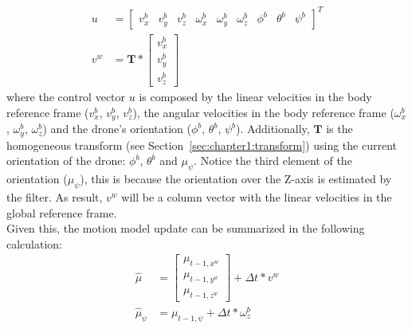 \begin{align}
    u &= \begin{bmatrix} v_x^b & v_y^b & v_z^b & \omega_x^b & \omega_y^b & \omega_z^b & \phi^b & \theta^b & \psi^b \end{bmatrix}^T\\
    v^w &= \textbf{T} * \begin{bmatrix} v_x^b \\ v_y^b \\ v_z^b \end{bmatrix}
\end{align}
where the control vector $u$ is composed by the linear velocities in the body reference frame ($v_x^b$, $v_y^b$, $v_z^b$), the angular velocities in the body reference frame ($\omega_x^b$, $\omega_y^b$, $\omega_z^b$) and the drone's orientation ($\phi^b$, $\theta^b$, $\psi^b$). Additionally, $\textbf{T}$ is the homogeneous transform (see Section~\ref{sec:chapter1:transform}) using the current orientation of the drone: $\phi^b$, $\theta^b$ and $\mu_{\psi}$. Notice the third element of the orientation ($\mu_{\psi}$), this is because the orientation over the Z-axis is estimated by the filter. As result, $v^w$ will be a column vector with the linear velocities in the global reference frame. \\

Given this, the motion model update can be summarized in the following calculation:
\begin{align}
    \hat\mu &=
    \begin{bmatrix}
        \mu_{t-1, x^w} \\ \mu_{t-1, y^w} \\ \mu_{t-1, z^w}
    \end{bmatrix}
    + \Delta t * v^w \\
    \hat\mu_{\psi} &= \mu_{t-1, \psi} + \Delta t * \omega_z^b
\end{align}


